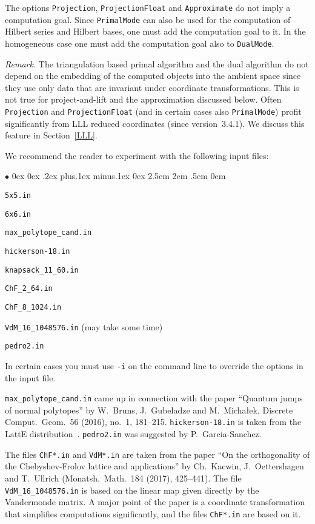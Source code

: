 \documentclass[12pt,a4paper]{scrartcl}
\newcommand{\stdli}{ \topsep0ex \partopsep0ex %
\parsep.2ex plus.1ex minus.1ex \itemsep0ex%
\leftmargin2.5em \labelwidth2em \labelsep.5em \rightmargin0em}%
\renewenvironment{itemize}{\begin{list}{{$\bullet$}}{\stdli}}{\end{list}}
\theoremstyle{definition}
\begin{document}
The options \verb|Projection|, \verb|ProjectionFloat| and \verb|Approximate| do not imply a computation goal. Since \verb|PrimalMode| can also be used for the computation of Hilbert series and Hilbert bases, one must add the computation goal to it. In the homogeneous case one must add the computation goal also to \verb|DualMode|.

\emph{Remark.}\enspace
The triangulation based primal algorithm and the dual algorithm do not depend on the embedding of the computed objects into the ambient space since they use only data that are invariant under coordinate transformations. This is not true for project-and-lift and the approximation discussed below. Often \verb|Projection| and \verb|ProjectionFloat| (and in certain cases also \verb|PrimalMode|) profit significantly from LLL reduced coordinates (since version~3.4.1). We discuss this feature in Section~\ref{LLL}.

We recommend the reader to experiment with the following input files:
\begin{itemize}
	\item \verb|5x5.in|
	\item \verb|6x6.in|
	\item \verb|max_polytope_cand.in|
	\item \verb|hickerson-18.in|
	\item \verb|knapsack_11_60.in|
	\item \verb|ChF_2_64.in|
	\item \verb|ChF_8_1024.in|
	\item \verb|VdM_16_1048576.in| (may take some time)
	\item \verb|pedro2.in|
\end{itemize}

In certain cases you must use \verb|-i| on the command line to override the options in the input file.

\verb|max_polytope_cand.in| came up in connection with the paper ``Quantum jumps of normal polytopes'' by W.~Bruns, J.~Gubeladze and M.~Micha\l{}ek, Discrete Comput.\ Geom.\ 56 (2016), no.\ 1, 181--215. \verb|hickerson-18.in| is taken from the LattE distribution~\cite{LatInt}. \verb|pedro2.in| was suggested by P.~Garcia-Sanchez.

The files \verb|ChF*.in| and \verb|VdM*.in| are taken from the paper ``On the orthogonality of the Chebyshev-Frolov lattice and applications'' by Ch.~Kacwin, J.~Oettershagen and T.~Ullrich (Monatsh.\ Math.\ 184 (2017), 425--441). The file \verb|VdM_16_1048576.in| is based on the linear map given directly by the Vandermonde matrix. A major point of the paper is a coordinate transformation that simplifies computations significantly, and the files \verb|ChF*.in| are based on it.
\end{document}
